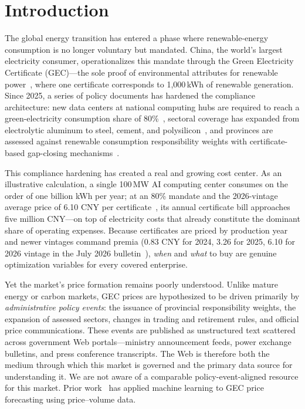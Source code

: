 \documentclass[sigconf,anonymous,review]{acmart}
\begin{document}
\maketitle
{}

\section{Introduction}

The global energy transition has entered a phase where renewable-energy consumption is no longer voluntary but mandated. China, the world's largest electricity consumer, operationalizes this mandate through the Green Electricity Certificate (GEC)---the sole proof of environmental attributes for renewable power~\cite{gec2023fullcoverage}, where one certificate corresponds to 1{,}000\,kWh of renewable generation. Since 2025, a series of policy documents has hardened the compliance architecture: new data centers at national computing hubs are required to reach a green-electricity consumption share of 80\%~\cite{gec2025opinion}, sectoral coverage has expanded from electrolytic aluminum to steel, cement, and polysilicon~\cite{gec2025opinion}, and provinces are assessed against renewable consumption responsibility weights with certificate-based gap-closing mechanisms~\cite{weight2025notice,measure2026order}.

This compliance hardening has created a real and growing cost center. As an illustrative calculation, a single 100\,MW AI computing center consumes on the order of one billion kWh per year; at an 80\% mandate and the 2026-vintage average price of 6.10 CNY per certificate~\cite{nea2026jul}, its annual certificate bill approaches five million CNY---on top of electricity costs that already constitute the dominant share of operating expenses. Because certificates are priced by production year and newer vintages command premia (0.83 CNY for 2024, 3.26 for 2025, 6.10 for 2026 vintage in the July 2026 bulletin~\cite{nea2026jul}), \emph{when} and \emph{what} to buy are genuine optimization variables for every covered enterprise.

Yet the market's price formation remains poorly understood. Unlike mature energy or carbon markets, GEC prices are hypothesized to be driven primarily by \emph{administrative policy events}: the issuance of provincial responsibility weights, the expansion of assessed sectors, changes in trading and retirement rules, and official price communications. These events are published as unstructured text scattered across government Web portals---ministry announcement feeds, power exchange bulletins, and press conference transcripts. The Web is therefore both the medium through which this market is governed and the primary data source for understanding it. We are not aware of a comparable policy-event-aligned resource for this market. Prior work~\cite{wang2025tgc} has applied machine learning to GEC price forecasting using price--volume data.
\end{document}
